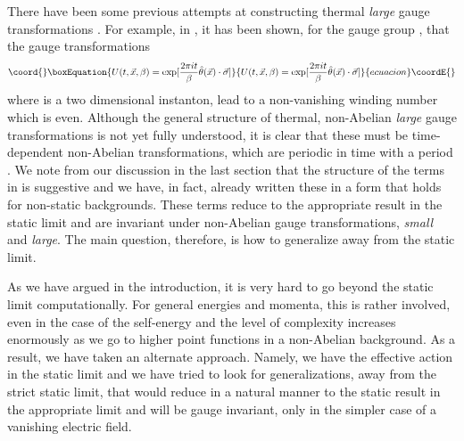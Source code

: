 \documentclass[a4paper,12pt]{article}
\begin{document}
There have been some previous attempts at constructing  thermal {\it
  large} gauge transformations \cite{Pisarski:1987gq,dunne:2001}. For
  example,  in
  \cite{Pisarski:1987gq} , it has been shown,
for the gauge group \coordHE{}, that the gauge transformations
\begin{equation}\coord{}\boxEquation{
U(t,\vec{x},\beta) = \exp [{2\pi i t\over \beta}
\hat{\theta}(\vec{x})\cdot\vec{\sigma} ]
}{
U(t,\vec{x},\beta) = \exp [{2\pi i t\over \beta}
\hat{\theta}(\vec{x})\cdot\vec{\sigma} ]
}{ecuacion}\coordE{}\end{equation}
where \coordHE{} is a two dimensional instanton, lead to
a non-vanishing winding number which is even. Although the general
structure of thermal, non-Abelian {\it large} gauge transformations is not yet
fully understood, it is clear that these must be time-dependent
non-Abelian transformations, which are periodic in time with a period
\myHighlight{$\beta$}\coordHE{}. We note from our discussion in the last section that the
structure of the terms in \coordHE{} is
suggestive and we have, in fact, already written these in a form that
holds for non-static backgrounds. These terms reduce to the
appropriate result in the static limit and are invariant under
non-Abelian gauge transformations, {\it small} and {\it large}. The
main question, therefore, is how to generalize \coordHE{} away from the static limit.

As we have argued in the introduction, it is very hard to go beyond
the static limit computationally. For general energies and momenta,
this is rather involved, even in the case of the self-energy
\cite{Brandt:2000dd} and the  level of complexity 
increases enormously as we go to higher point functions in a
non-Abelian background. 
As a result, we have taken an alternate approach. Namely, we have the
effective action in the static limit and we have tried to look for
generalizations, away from the strict static limit, that would reduce
in a natural manner to the static result in the appropriate limit and
will be gauge invariant, only in the simpler case of a vanishing
electric field. 
\end{document}
